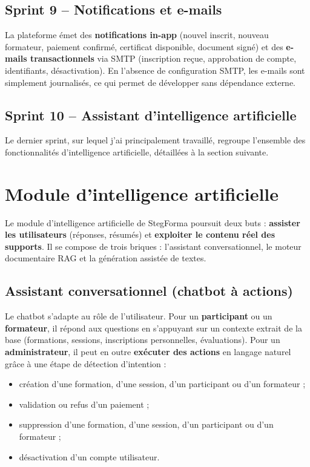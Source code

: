 \documentclass[12pt,a4paper]{report}
\begin{document}
\subsection{Sprint 9 -- Notifications et e-mails}

La plateforme émet des \textbf{notifications in-app} (nouvel inscrit, nouveau formateur, paiement confirmé, certificat disponible, document signé) et des \textbf{e-mails transactionnels} via SMTP (inscription reçue, approbation de compte, identifiants, désactivation). En l'absence de configuration SMTP, les e-mails sont simplement journalisés, ce qui permet de développer sans dépendance externe.

\subsection{Sprint 10 -- Assistant d'intelligence artificielle}

Le dernier sprint, sur lequel j'ai principalement travaillé, regroupe l'ensemble des fonctionnalités d'intelligence artificielle, détaillées à la section suivante.

\section{Module d'intelligence artificielle}

Le module d'intelligence artificielle de StegForma poursuit deux buts : \textbf{assister les utilisateurs} (réponses, résumés) et \textbf{exploiter le contenu réel des supports}. Il se compose de trois briques : l'assistant conversationnel, le moteur documentaire RAG et la génération assistée de textes.

\subsection{Assistant conversationnel (chatbot à actions)}

Le chatbot s'adapte au rôle de l'utilisateur. Pour un \textbf{participant} ou un \textbf{formateur}, il répond aux questions en s'appuyant sur un contexte extrait de la base (formations, sessions, inscriptions personnelles, évaluations). Pour un \textbf{administrateur}, il peut en outre \textbf{exécuter des actions} en langage naturel grâce à une étape de détection d'intention :

\begin{itemize}
    \item création d'une formation, d'une session, d'un participant ou d'un formateur ;
    \item validation ou refus d'un paiement ;
    \item suppression d'une formation, d'une session, d'un participant ou d'un formateur ;
    \item désactivation d'un compte utilisateur.
\end{itemize}
\end{document}
